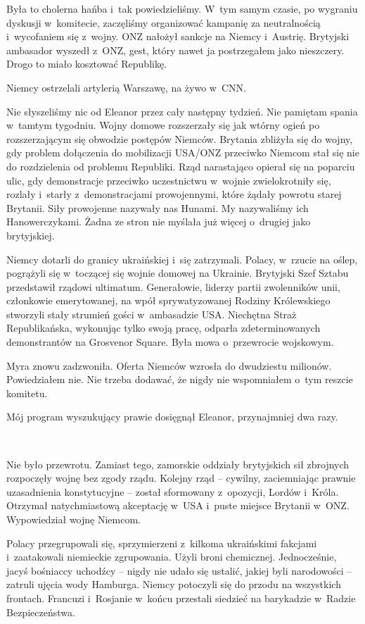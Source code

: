\documentclass[oneside,polish,11pt,sfheadings]{mwbk}
\begin{document}
Była to cholerna hańba i~tak powiedzieliśmy. W~tym samym czasie, po
wygraniu dyskusji w~komitecie, zaczęliśmy organizować kampanię za
neutralnością i~wycofaniem się z~wojny. ONZ nałożył sankcje na Niemcy i~Austrię. Brytyjski ambasador wyszedł z~ONZ, gest, który nawet ja
postrzegałem jako nieszczery. Drogo to miało kosztować Republikę.

Niemcy ostrzelali artylerią Warszawę, na żywo w~CNN.

Nie słyszeliśmy nic od Eleanor przez cały następny tydzień. Nie pamiętam
spania w~tamtym tygodniu. Wojny domowe rozszerzały się jak wtórny ogień
po rozszerzającym się obwodzie postępów Niemców. Brytania zbliżyła się
do wojny, gdy problem dołączenia do mobilizacji USA/ONZ przeciwko
Niemcom stał się nie do rozdzielenia od problemu Republiki. Rząd
narastająco opierał się na poparciu ulic, gdy demonstracje przeciwko
uczestnictwu w~wojnie zwielokrotniły się, rozlały i~starły z~demonstracjami prowojennymi, które żądały powrotu starej Brytanii. Siły
prowojenne nazywały nas Hunami. My nazywaliśmy ich Hanowerczykami. Żadna
ze stron nie myślała już więcej o~drugiej jako brytyjskiej.

Niemcy dotarli do granicy ukraińskiej i~się zatrzymali. Polacy, w~rzucie
na oślep, pogrążyli się w~toczącej się wojnie domowej na Ukrainie.
Brytyjski Szef Sztabu przedstawił rządowi ultimatum. Generałowie,
liderzy partii zwolenników unii, członkowie emerytowanej, na wpół
sprywatyzowanej Rodziny Królewskiego stworzyli stały strumień gości w~ambasadzie USA. Niechętna Straż Republikańska, wykonując tylko swoją
pracę, odparła zdeterminowanych demonstrantów na Grosvenor Square. Była
mowa o~przewrocie wojskowym.

Myra znowu zadzwoniła. Oferta Niemców wzrosła do dwudziestu milionów.
Powiedziałem nie. Nie trzeba dodawać, że nigdy nie wspomniałem o~tym
reszcie komitetu.

Mój program wyszukujący prawie dosięgnął Eleanor, przynajmniej dwa razy.

~

Nie było przewrotu. Zamiast tego, zamorskie oddziały brytyjskich sił
zbrojnych rozpoczęły wojnę bez zgody rządu. Kolejny rząd -- cywilny,
zaciemniając prawnie uzasadnienia konstytucyjne -- został sformowany z~opozycji, Lordów i~Króla. Otrzymał natychmiastową akceptację w~USA i~puste miejsce Brytanii w~ONZ. Wypowiedział wojnę Niemcom.

Polacy przegrupowali się, sprzymierzeni z~kilkoma ukraińskimi fakcjami i~zaatakowali niemieckie zgrupowania. Użyli broni chemicznej.
Jednocześnie, jacyś bośniaccy uchodźcy -- nigdy nie udało się ustalić,
jakiej byli narodowości -- zatruli ujęcia wody Hamburga. Niemcy potoczyli
się do przodu na wszystkich frontach. Francuzi i~Rosjanie w~końcu
przestali siedzieć na barykadzie w~Radzie Bezpieczeństwa.
\end{document}
